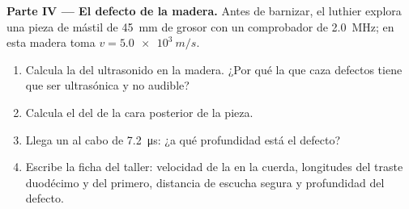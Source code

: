 \begin{problem}
\medskip
\noindent\textbf{Parte IV --- El defecto de la madera.}
Antes de barnizar, el luthier explora una pieza de mástil de \qty{45}{mm}
de grosor con un comprobador de \qty{2.0}{MHz}; en esta madera toma
$v = \qty{5.0e3}{m/s}$.
\begin{enumerate}[resume]
  \item Calcula la  del ultrasonido en la madera. ¿Por
        qué la  que caza defectos tiene que ser ultrasónica y no
        audible?
  \item Calcula el  del  de la cara posterior de la pieza.
  \item Llega un  al cabo de \qty{7.2}{\micro s}: ¿a qué profundidad
        está el defecto?
  \item Escribe la ficha del taller: velocidad de la  en la cuerda,
        longitudes del traste duodécimo y del primero, distancia de
        escucha segura y profundidad del defecto.
\end{enumerate}
\end{problem}
